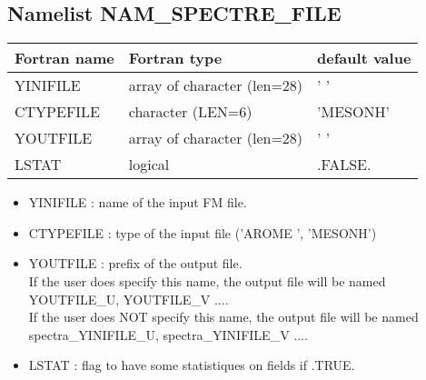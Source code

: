 \subsection{Namelist NAM\_SPECTRE\_FILE}
\begin{center}
\begin{tabular} {|l|l|l|}
\hline
Fortran name & Fortran type & default value \\
\hline
YINIFILE    & array of character (len=28)  & ' '\\
CTYPEFILE   & character (LEN=6)  & 'MESONH'      \\
YOUTFILE    & array of character (len=28)  & ' '\\
LSTAT       & logical  & .FALSE. \\        
\hline
\end{tabular}
\end{center}
\begin{itemize}
\item YINIFILE : name of the input FM file.
\item CTYPEFILE : type of the input  file ('AROME ', 'MESONH')
\item YOUTFILE  : prefix of the output file.\\
If the user does specify this name, the output file will be named YOUTFILE\_U, YOUTFILE\_V ....\\
If the user does NOT specify this name, the output file will be named spectra\_YINIFILE\_U, spectra\_YINIFILE\_V ....
\item LSTAT : flag to have some statistiques on fields if .TRUE.
\end{itemize}


